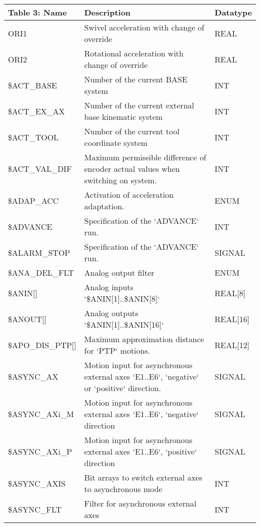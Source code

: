 \begin{appendices}
        \newpage
        \begin{tabular}{|p{}|p{}|p{}|}
        \hline
        \textbf{Table 3: Name} & \textbf{Description} & \textbf{Datatype} \\ \hline
        \quad ORI1 & Swivel acceleration with change of override & REAL \\ \hline
        \quad ORI2 & Rotational acceleration with change of override & REAL \\ \hline
        \$ACT\_BASE & Number of the current BASE system & INT \\ \hline
        \$ACT\_EX\_AX & Number of the current external base kinematic system & INT \\ \hline
        \$ACT\_TOOL & Number of the current tool coordinate system & INT \\ \hline
        \$ACT\_VAL\_DIF & Maximum permissible difference of encoder actual values when switching on system. & INT \\ \hline
        \$ADAP\_ACC & Activation of acceleration adaptation. & ENUM \\ \hline
        \$ADVANCE & Specification of the `ADVANCE` run. & INT \\ \hline
        \$ALARM\_STOP & Specification of the `ADVANCE` run. & SIGNAL \\ \hline
        \$ANA\_DEL\_FLT & Analog output filter & ENUM \\ \hline
        \$ANIN[] & Analog inputs `\$ANIN[1]..\$ANIN[8]` & REAL[8] \\ \hline
        \$ANOUT[] & Analog outputs `\$ANIN[1]..\$ANIN[16]` & REAL[16] \\ \hline
        \$APO\_DIS\_PTP[] & Maximum approximation distance for `PTP` motions. & REAL[12] \\ \hline
        \$ASYNC\_AX & Motion input for asynchronous external axes `E1..E6`, `negative` or `positive` direction. & SIGNAL \\ \hline
        \$ASYNC\_AXi\_M & Motion input for asynchronous external axes `E1..E6`, `negative` direction & SIGNAL \\ \hline
        \$ASYNC\_AXi\_P & Motion input for asynchronous external axes `E1..E6`, `positive` direction & SIGNAL \\ \hline
        \$ASYNC\_AXIS & Bit arrays to switch external axes to asynchronous mode & INT \\ \hline
        \$ASYNC\_FLT & Filter for asynchronous external axes & INT \\ \hline
        \end{tabular}
        

\end{appendices}

